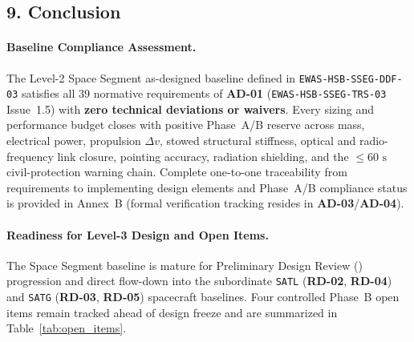 \subsection{9. Conclusion}

\paragraph{Baseline Compliance Assessment.}
The Level-2 Space Segment as-designed baseline defined in \texttt{EWAS-HSB-SSEG-DDF-03} satisfies all 39 normative requirements of \textbf{AD-01} (\texttt{EWAS-HSB-SSEG-TRS-03} Issue~1.5) with \textbf{zero technical deviations or waivers}. Every sizing and performance budget closes with positive Phase~A/B reserve across mass, electrical power, propulsion $\Delta v$, stowed structural stiffness, optical and radio-frequency link closure, pointing accuracy, radiation shielding, and the $\le 60\text{ s}$ civil-protection warning chain. Complete one-to-one traceability from requirements to implementing design elements and Phase~A/B compliance status is provided in Annex~B (formal verification tracking resides in \textbf{AD-03}/\textbf{AD-04}).

\paragraph{Readiness for Level-3 Design and Open Items.}
The Space Segment baseline is mature for Preliminary Design Review () progression and direct flow-down into the subordinate \texttt{SATL} (\textbf{RD-02}, \textbf{RD-04}) and \texttt{SATG} (\textbf{RD-03}, \textbf{RD-05}) spacecraft baselines. Four controlled Phase~B open items remain tracked ahead of design freeze and are summarized in Table~\ref{tab:open_items}.

